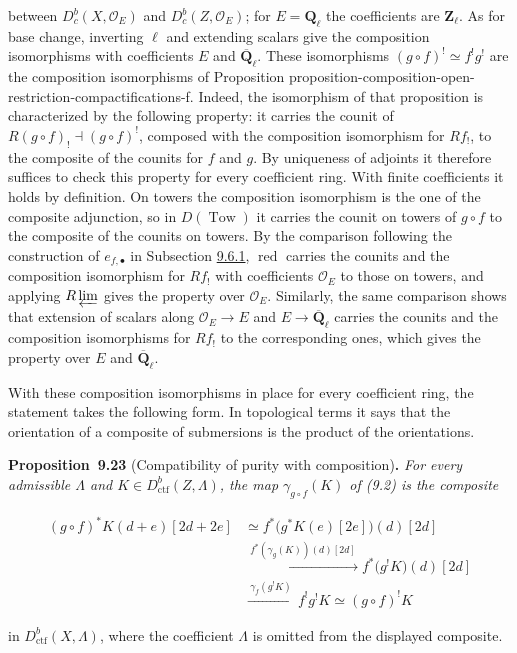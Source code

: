 \documentclass[11pt]{article}
\newenvironment{bpstatement}[2]{\par\addvspace{0.6\baselineskip}\noindent\textbf{#1}#2\textbf{.}\enspace\ignorespaces}
  {\par\addvspace{0.4\baselineskip}}
\newenvironment{bpstatementit}[2]{\begin{bpstatement}{#1}{#2}\itshape\ignorespaces}{\end{bpstatement}}
\providecommand{\Dbc}{}\renewcommand{\Dbc}{D^b_c}
\begin{document}
between \(\Dbc(X,\mathcal O_E)\) and \(\Dbc(Z,\mathcal O_E)\); for \(E=\mathbf Q_\ell\) the coefficients are \(\mathbf Z_\ell\). As for base change, inverting \(\ell\) and extending scalars give the composition isomorphisms with coefficients \(E\) and \(\overline{\mathbf Q}_\ell\). These isomorphisms \((g\circ f)^!\simeq f^!g^!\) are the composition isomorphisms of Proposition proposition-composition-open-restriction-compactifications-f. Indeed, the isomorphism of that proposition is characterized by the following property: it carries the counit of \(R(g\circ f)_!\dashv(g\circ f)^!\), composed with the composition isomorphism for \(Rf_!\), to the composite of the counits for \(f\) and \(g\). By uniqueness of adjoints it therefore suffices to check this property for every coefficient ring. With finite coefficients it holds by definition. On towers the composition isomorphism is the one of the composite adjunction, so in \(D(\operatorname{Tow})\) it carries the counit on towers of \(g\circ f\) to the composite of the counits on towers. By the comparison following the construction of \(e_{f,\bullet}\) in Subsection \hyperref[bp76]{9.6.1}, \(\operatorname{red}\) carries the counits and the composition isomorphism for \(Rf_!\) with coefficients \(\mathcal O_E\) to those on towers, and applying \(R\varprojlim\) gives the property over \(\mathcal O_E\). Similarly, the same comparison shows that extension of scalars along \(\mathcal O_E\to E\) and \(E\to\overline{\mathbf Q}_\ell\) carries the counits and the composition isomorphisms for \(Rf_!\) to the corresponding ones, which gives the property over \(E\) and \(\overline{\mathbf Q}_\ell\).

With these composition isomorphisms in place for every coefficient ring, the statement takes the following form. In topological terms it says that the orientation of a composite of submersions is the product of the orientations.

\label{bp81}%
\begin{bpstatementit}{Proposition~9.23}{ (Compatibility of purity with composition)}
For every admissible \(\Lambda\) and \(K\in D^b_{\mathrm{ctf}}(Z,\Lambda)\), the map \(\gamma_{g\circ f}(K)\) of (9.2) is the composite

\[
\begin{aligned}
(g\circ f)^{*}K(d+e)[2d+2e]
&\simeq f^{*}\bigl(g^{*}K(e)[2e]\bigr)(d)[2d]\\
&\xrightarrow{\ f^{*}(\gamma_g(K))(d)[2d]\ }
f^{*}\bigl(g^!K\bigr)(d)[2d]\\
&\xrightarrow{\ \gamma_f(g^!K)\ }
f^!g^!K
\simeq(g\circ f)^!K
\end{aligned}
\]

in \(D^b_{\mathrm{ctf}}(X,\Lambda)\), where the coefficient \(\Lambda\) is omitted from the displayed composite.
\end{bpstatementit}
\end{document}
